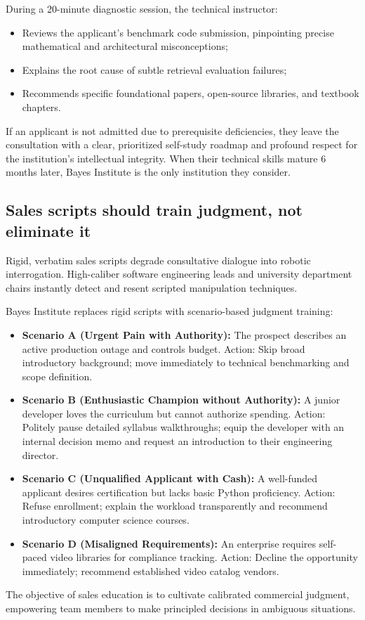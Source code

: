 During a 20-minute diagnostic session, the technical instructor:
\begin{itemize}
\item Reviews the applicant's benchmark code submission, pinpointing precise mathematical and architectural misconceptions;
\item Explains the root cause of subtle retrieval evaluation failures;
\item Recommends specific foundational papers, open-source libraries, and textbook chapters.
\end{itemize}
If an applicant is not admitted due to prerequisite deficiencies, they leave the consultation with a clear, prioritized self-study roadmap and profound respect for the institution's intellectual integrity. When their technical skills mature 6 months later, Bayes Institute is the only institution they consider.

\subsection{Sales scripts should train judgment, not eliminate it}

Rigid, verbatim sales scripts degrade consultative dialogue into robotic interrogation. High-caliber software engineering leads and university department chairs instantly detect and resent scripted manipulation techniques.

Bayes Institute replaces rigid scripts with scenario-based judgment training:
\begin{itemize}
\item \textbf{Scenario A (Urgent Pain with Authority):} The prospect describes an active production outage and controls budget. Action: Skip broad introductory background; move immediately to technical benchmarking and scope definition.
\item \textbf{Scenario B (Enthusiastic Champion without Authority):} A junior developer loves the curriculum but cannot authorize spending. Action: Politely pause detailed syllabus walkthroughs; equip the developer with an internal decision memo and request an introduction to their engineering director.
\item \textbf{Scenario C (Unqualified Applicant with Cash):} A well-funded applicant desires certification but lacks basic Python proficiency. Action: Refuse enrollment; explain the workload transparently and recommend introductory computer science courses.
\item \textbf{Scenario D (Misaligned Requirements):} An enterprise requires self-paced video libraries for compliance tracking. Action: Decline the opportunity immediately; recommend established video catalog vendors.
\end{itemize}
The objective of sales education is to cultivate calibrated commercial judgment, empowering team members to make principled decisions in ambiguous situations.


